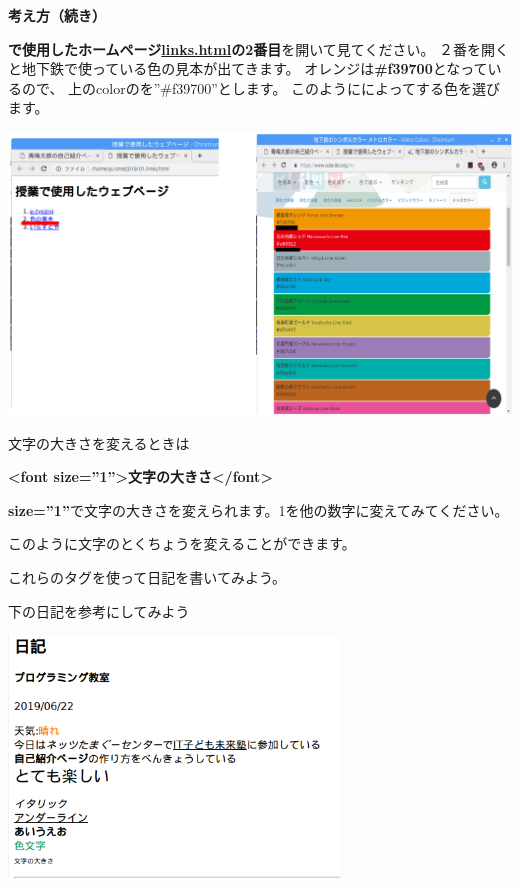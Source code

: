 \documentclass[a4paper,12pt]{jarticle}
\begin{document}
\clearpage
\textbf{考え方（続き）}



\textbf{で使用したホームページ\url{links.html}の2番目}を開いて見てください。
２番を開くと地下鉄で使っている色の見本が出てきます。
オレンジは\textbf{\#f39700}となっているので、
上のcolorのを”\#f39700”とします。
このようにによってする色を選びます。



\bigskip

\includegraphics[width=\textwidth]{textbook-img187.png}

文字の大きさを変えるときは

\textbf{{\textless}font size=”1”{\textgreater}文字の大きさ{\textless}/font{\textgreater}}

\textbf{size=”1”}で文字の大きさを変えられます。1を他の数字に変えてみてください。

このように文字のとくちょうを変えることができます。


\bigskip

これらのタグを使って日記を書いてみよう。

下の日記を参考にしてみよう


\bigskip

\includegraphics[width=8.779cm]{textbook-img185.png}
\end{document}
